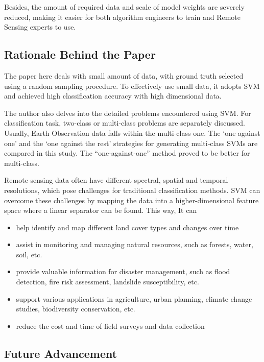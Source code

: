 \documentclass[
  letterpaper,
  DIV=11,
  numbers=noendperiod]{scrreprt}
\providecommand{\tightlist}{%
  \setlength{\itemsep}{0pt}\setlength{\parskip}{0pt}}\usepackage{longtable,booktabs,array}
\begin{document}
Besides, the amount of required data and scale of model weights are
severely reduced, making it easier for both algorithm engineers to train
and Remote Sensing experts to use.

\hypertarget{rationale-behind-the-paper}{%
\subsection{Rationale Behind the
Paper}\label{rationale-behind-the-paper}}

The paper here deals with small amount of data, with ground truth
selected using a random sampling procedure. To effectively use small
data, it adopts SVM and achieved high classification accuracy with high
dimensional data.

The author also delves into the detailed problems encountered using SVM.
For classification task, two-class or multi-class problems are
separately discussed. Usually, Earth Observation data falls within the
multi-class one. The `one against one' and the `one against the rest'
strategies for generating multi‐class SVMs are compared in this study.
The ``one-against-one'' method proved to be better for multi-class.

Remote-sensing data often have different spectral, spatial and temporal
resolutions, which pose challenges for traditional classification
methods. SVM can overcome these challenges by mapping the data into a
higher-dimensional feature space where a linear separator can be found.
This way, It can

\begin{itemize}
\tightlist
\item
  help identify and map different land cover types and changes over time
\item
  assist in monitoring and managing natural resources, such as forests,
  water, soil, etc.
\item
  provide valuable information for disaster management, such as flood
  detection, fire risk assessment, landslide susceptibility, etc.
\item
  support various applications in agriculture, urban planning, climate
  change studies, biodiversity conservation, etc.
\item
  reduce the cost and time of field surveys and data collection
\end{itemize}

\hypertarget{future-advancement}{%
\subsection{Future Advancement}\label{future-advancement}}
\end{document}
